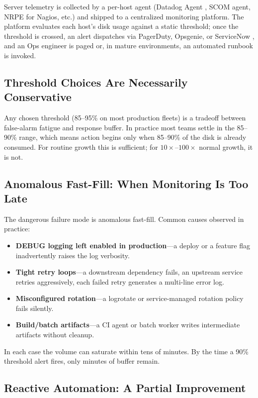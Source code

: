 \documentclass[conference]{IEEEtran}
\begin{document}
Server telemetry is collected by a per-host agent (Datadog Agent
\cite{datadog2024disk}, SCOM agent, NRPE for Nagios, etc.) and shipped
to a centralized monitoring platform. The platform evaluates each
host's disk usage against a static threshold; once the threshold is
crossed, an alert dispatches via PagerDuty, Opsgenie, or ServiceNow
\cite{servicenow2024incident}, and an Ops engineer is paged or, in
mature environments, an automated runbook is invoked.

\subsection{Threshold Choices Are Necessarily Conservative}

Any chosen threshold (85--95\% on most production fleets) is a
tradeoff between false-alarm fatigue and response buffer. In practice
most teams settle in the 85--90\% range, which means action begins
only when 85--90\% of the disk is already consumed. For routine
growth this is sufficient; for $10\times$--$100\times$ normal growth,
it is not.

\subsection{Anomalous Fast-Fill: When Monitoring Is Too Late}

The dangerous failure mode is anomalous fast-fill. Common causes
observed in practice:
\begin{itemize}
\item \textbf{DEBUG logging left enabled in production}---a deploy
or a feature flag inadvertently raises the log verbosity.
\item \textbf{Tight retry loops}---a downstream dependency fails, an
upstream service retries aggressively, each failed retry generates a
multi-line error log.
\item \textbf{Misconfigured rotation}---a logrotate or
service-managed rotation policy fails silently.
\item \textbf{Build/batch artifacts}---a CI agent or batch worker
writes intermediate artifacts without cleanup.
\end{itemize}

In each case the volume can saturate within tens of minutes. By the
time a 90\% threshold alert fires, only minutes of buffer remain.

\subsection{Reactive Automation: A Partial Improvement}
\end{document}
